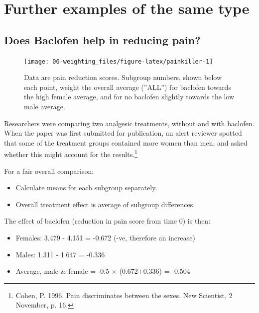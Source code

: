\documentclass[
  10pt,
  b5paper]{book}
\providecommand{\tightlist}{%
  \setlength{\itemsep}{0pt}\setlength{\parskip}{0pt}}
\begin{document}
\hypertarget{further-examples-of-the-same-type}{%
\section{Further examples of the same type}\label{further-examples-of-the-same-type}}

\hypertarget{does-baclofen-help-in-reducing-pain}{%
\subsection*{Does Baclofen help in reducing pain?}\label{does-baclofen-help-in-reducing-pain}}

\begin{figure}

{\centering \texttt{[image: 06-weighting\_files/figure-latex/painkiller-1]} 

}

\caption{Data are pain reduction scores. Subgroup numbers, shown
    below each point, weight the overall average (''ALL'') for
    baclofen towards the high female average, and for no baclofen
    slightly towards the low male average.}\label{fig:painkiller}
\end{figure}

Researchers were comparing two
analgesic treatments, without and with baclofen. When the paper was
first submitted for publication, an alert reviewer spotted that some
of the treatment groups contained more women than men, and asked
whether this might account for the
results.\footnote{Cohen, P. 1996. Pain discriminates between the
sexes.  New Scientist, 2 November, p. 16.}

For a fair overall comparison:

\begin{itemize}
\tightlist
\item
  Calculate means for each subgroup separately.
\item
  Overall treatment effect is average of subgroup differences.
\end{itemize}

The effect of baclofen (reduction in pain score from time 0) is then:

\begin{itemize}
\tightlist
\item
  Females: 3.479 - 4.151 = -0.672 (-ve, therefore an increase)
\item
  Males: 1.311 - 1.647 = -0.336
\item
  Average, male \& female = -0.5 \(\times\) (0.672+0.336) = -0.504
\end{itemize}
\end{document}
